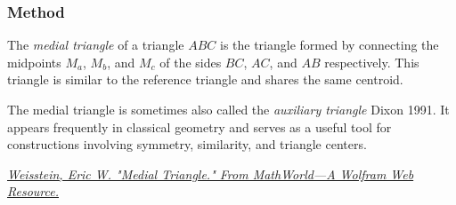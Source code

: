 \subsubsection{Method } %
\label{ssub:method_triangle_medial}

The \emph{medial triangle} of a triangle $ABC$ is the triangle formed by connecting the midpoints $M_a$, $M_b$, and $M_c$ of the sides $BC$, $AC$, and $AB$ respectively. This triangle is similar to the reference triangle and shares the same centroid.

The medial triangle is sometimes also called the \emph{auxiliary triangle} Dixon 1991. It appears frequently in classical geometry and serves as a useful tool for constructions involving symmetry, similarity, and triangle centers.

\begin{flushright}
  \small
\href{https://mathworld.wolfram.com/MedialTriangle.html}
{\textit{Weisstein, Eric W. "Medial Triangle." From MathWorld—A Wolfram Web Resource.}}
\end{flushright}

\vspace{1em}

\vspace{1em}
\begin{minipage}{.5\textwidth}
\begin{center}
  \end{center}
\end{minipage}
\begin{minipage}{.5\textwidth}
\begin{tkzexample}
\end{tkzexample}
\end{minipage}


